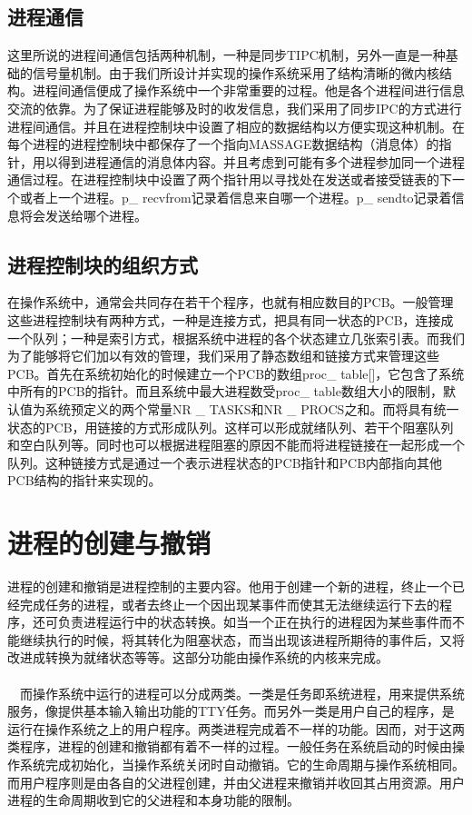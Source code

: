 \documentclass[UTF8,nofonts,cs4size]{ctexrep}
\begin{document}
\subsection{进程通信}
这里所说的进程间通信包括两种机制，一种是同步TIPC机制，另外一直是一种基础的信号量机制。由于我们所设计并实现的操作系统采用了结构清晰的微内核结构。进程间通信便成了操作系统中一个非常重要的过程。他是各个进程间进行信息交流的依靠。为了保证进程能够及时的收发信息，我们采用了同步IPC的方式进行进程间通信。并且在进程控制块中设置了相应的数据结构以方便实现这种机制。在每个进程的进程控制块中都保存了一个指向MASSAGE数据结构（消息体）的指针，用以得到进程通信的消息体内容。并且考虑到可能有多个进程参加同一个进程通信过程。在进程控制块中设置了两个指针用以寻找处在发送或者接受链表的下一个或者上一个进程。p\_ recvfrom记录着信息来自哪一个进程。p\_ sendto记录着信息将会发送给哪个进程。
\subsection{进程控制块的组织方式}
在操作系统中，通常会共同存在若干个程序，也就有相应数目的PCB。一般管理这些进程控制块有两种方式，一种是连接方式，把具有同一状态的PCB，连接成一个队列；一种是索引方式，根据系统中进程的各个状态建立几张索引表。而我们为了能够将它们加以有效的管理，我们采用了静态数组和链接方式来管理这些PCB。首先在系统初始化的时候建立一个PCB的数组proc\_ table[]，它包含了系统中所有的PCB的指针。而且系统中最大进程数受proc\_ table数组大小的限制，默认值为系统预定义的两个常量NR \_ TASKS和NR \_  PROCS之和。而将具有统一状态的PCB，用链接的方式形成队列。这样可以形成就绪队列、若干个阻塞队列和空白队列等。同时也可以根据进程阻塞的原因不能而将进程链接在一起形成一个队列。这种链接方式是通过一个表示进程状态的PCB指针和PCB内部指向其他PCB结构的指针来实现的。
\section{进程的创建与撤销}
进程的创建和撤销是进程控制的主要内容。他用于创建一个新的进程，终止一个已经完成任务的进程，或者去终止一个因出现某事件而使其无法继续运行下去的程序，还可负责进程运行中的状态转换。如当一个正在执行的进程因为某些事件而不能继续执行的时候，将其转化为阻塞状态，而当出现该进程所期待的事件后，又将改进成转换为就绪状态等等。这部分功能由操作系统的内核来完成。
\paragraph{}
\indent \ \ 而操作系统中运行的进程可以分成两类。一类是任务即系统进程，用来提供系统服务，像提供基本输入输出功能的TTY任务。而另外一类是用户自己的程序，是运行在操作系统之上的用户程序。两类进程完成着不一样的功能。因而，对于这两类程序，进程的创建和撤销都有着不一样的过程。一般任务在系统启动的时候由操作系统完成初始化，当操作系统关闭时自动撤销。它的生命周期与操作系统相同。而用户程序则是由各自的父进程创建，并由父进程来撤销并收回其占用资源。用户进程的生命周期收到它的父进程和本身功能的限制。
\end{document}
